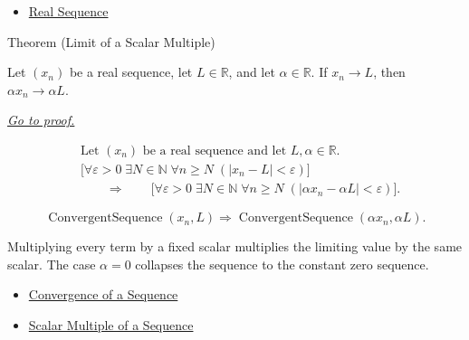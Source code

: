 \begin{dependencies}
\begin{itemize}
  \item \hyperref[def:real-sequence]{Real Sequence}
\end{itemize}
\end{dependencies}


\begin{theorembox}{Theorem (Limit of a Scalar Multiple)}
\begin{theorem}
\label{thm:limit-of-scalar-multiple}
Let $(x_n)$ be a real sequence, let $L\in\mathbb{R}$, and let
$\alpha\in\mathbb{R}$. If $x_n\to L$, then $\alpha x_n\to \alpha L$.

\smallskip
\noindent
\hyperref[prf:limit-of-scalar-multiple]{\textit{Go to proof.}}
\end{theorem}
\end{theorembox}

\begin{remark*}
\[
\begin{aligned}
&\text{Let } (x_n) \text{ be a real sequence and let }
  L,\alpha\in\mathbb{R}.\\
&\bigl[
\forall \varepsilon>0\;\exists N\in\mathbb{N}\;\forall n\ge N\;
(|x_n-L|<\varepsilon)
\bigr]\\
&\qquad\Longrightarrow\qquad
\bigl[
\forall \varepsilon>0\;\exists N\in\mathbb{N}\;\forall n\ge N\;
(|\alpha x_n-\alpha L|<\varepsilon)
\bigr].
\end{aligned}
\]
\end{remark*}

\begin{remark*}
\[
\operatorname{ConvergentSequence}(x_n,L)
\Longrightarrow
\operatorname{ConvergentSequence}(\alpha x_n,\alpha L).
\]
\end{remark*}

\begin{remark*}[Interpretation]
Multiplying every term by a fixed scalar multiplies the limiting value by the
same scalar. The case $\alpha=0$ collapses the sequence to the constant zero
sequence.
\end{remark*}

\begin{dependencies}
\begin{itemize}
  \item \hyperref[def:convergent-sequence]{Convergence of a Sequence}
  \item \hyperref[def:scalar-multiple-sequence]{Scalar Multiple of a Sequence}
\end{itemize}
\end{dependencies}

